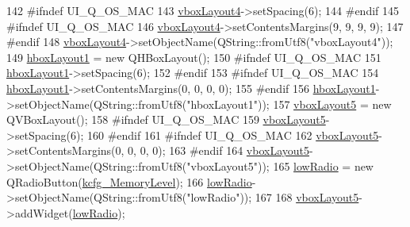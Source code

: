 \begin{DoxyCode}
142 \textcolor{preprocessor}{#ifndef UI\_Q\_OS\_MAC}
143         \hyperlink{classUi__DlgPerformanceBase_a8cc54ee3f49d72f579529a8c662a83d7}{vboxLayout4}->setSpacing(6);
144 \textcolor{preprocessor}{#endif}
145 \textcolor{preprocessor}{#ifndef UI\_Q\_OS\_MAC}
146         \hyperlink{classUi__DlgPerformanceBase_a8cc54ee3f49d72f579529a8c662a83d7}{vboxLayout4}->setContentsMargins(9, 9, 9, 9);
147 \textcolor{preprocessor}{#endif}
148         \hyperlink{classUi__DlgPerformanceBase_a8cc54ee3f49d72f579529a8c662a83d7}{vboxLayout4}->setObjectName(QString::fromUtf8(\textcolor{stringliteral}{"vboxLayout4"}));
149         \hyperlink{classUi__DlgPerformanceBase_ade0a3a0e7bb84cff157c402871c86973}{hboxLayout1} = \textcolor{keyword}{new} QHBoxLayout();
150 \textcolor{preprocessor}{#ifndef UI\_Q\_OS\_MAC}
151         \hyperlink{classUi__DlgPerformanceBase_ade0a3a0e7bb84cff157c402871c86973}{hboxLayout1}->setSpacing(6);
152 \textcolor{preprocessor}{#endif}
153 \textcolor{preprocessor}{#ifndef UI\_Q\_OS\_MAC}
154         \hyperlink{classUi__DlgPerformanceBase_ade0a3a0e7bb84cff157c402871c86973}{hboxLayout1}->setContentsMargins(0, 0, 0, 0);
155 \textcolor{preprocessor}{#endif}
156         \hyperlink{classUi__DlgPerformanceBase_ade0a3a0e7bb84cff157c402871c86973}{hboxLayout1}->setObjectName(QString::fromUtf8(\textcolor{stringliteral}{"hboxLayout1"}));
157         \hyperlink{classUi__DlgPerformanceBase_aca07571304c349fac4fe04a617341403}{vboxLayout5} = \textcolor{keyword}{new} QVBoxLayout();
158 \textcolor{preprocessor}{#ifndef UI\_Q\_OS\_MAC}
159         \hyperlink{classUi__DlgPerformanceBase_aca07571304c349fac4fe04a617341403}{vboxLayout5}->setSpacing(6);
160 \textcolor{preprocessor}{#endif}
161 \textcolor{preprocessor}{#ifndef UI\_Q\_OS\_MAC}
162         \hyperlink{classUi__DlgPerformanceBase_aca07571304c349fac4fe04a617341403}{vboxLayout5}->setContentsMargins(0, 0, 0, 0);
163 \textcolor{preprocessor}{#endif}
164         \hyperlink{classUi__DlgPerformanceBase_aca07571304c349fac4fe04a617341403}{vboxLayout5}->setObjectName(QString::fromUtf8(\textcolor{stringliteral}{"vboxLayout5"}));
165         \hyperlink{classUi__DlgPerformanceBase_a061da5609688bcfe645b49acad1a34bc}{lowRadio} = \textcolor{keyword}{new} QRadioButton(\hyperlink{classUi__DlgPerformanceBase_a93edac845d7c5b17eb8daf50d97d0e3f}{kcfg\_MemoryLevel});
166         \hyperlink{classUi__DlgPerformanceBase_a061da5609688bcfe645b49acad1a34bc}{lowRadio}->setObjectName(QString::fromUtf8(\textcolor{stringliteral}{"lowRadio"}));
167 
168         \hyperlink{classUi__DlgPerformanceBase_aca07571304c349fac4fe04a617341403}{vboxLayout5}->addWidget(\hyperlink{classUi__DlgPerformanceBase_a061da5609688bcfe645b49acad1a34bc}{lowRadio});

\end{DoxyCode}
